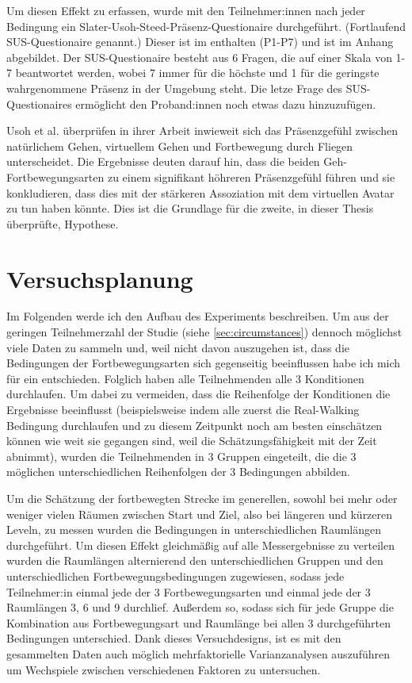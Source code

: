             Um diesen Effekt zu erfassen, wurde mit den Teilnehmer:innen nach jeder Bedingung ein Slater-Usoh-Steed-Präsenz-Questionaire \cite{presence-questionaire} durchgeführt. (Fortlaufend SUS-Questionaire genannt.) Dieser ist im  enthalten (P1-P7) und ist im Anhang abgebildet. Der SUS-Questionaire besteht aus 6 Fragen, die auf einer Skala von 1-7 beantwortet werden, wobei 7 immer für die höchste und 1 für die geringste wahrgenommene Präsenz in der Umgebung steht. Die letze Frage des SUS-Questionaires ermöglicht den Proband:innen noch etwas dazu hinzuzufügen.

            Usoh et al. überprüfen in ihrer Arbeit \cite{usoh-vergleich-1999} inwieweit sich das Präsenzgefühl zwischen natürlichem Gehen, virtuellem Gehen und Fortbewegung durch Fliegen unterscheidet. Die Ergebnisse deuten darauf hin, dass die beiden Geh-Fortbewegungsarten zu einem signifikant höhreren Präsenzgefühl führen und sie konkludieren, dass dies mit der stärkeren Assoziation mit dem virtuellen Avatar zu tun haben könnte. Dies ist die Grundlage für die zweite, in dieser Thesis überprüfte, Hypothese.



    \section{Versuchsplanung}\label{sec:setup}
    Im Folgenden werde ich den Aufbau des Experiments beschreiben.
    Um aus der geringen Teilnehmerzahl der Studie (siehe \autoref{sec:circumstances})
    dennoch möglichst viele Daten zu sammeln und, weil nicht davon auszugehen ist, dass die Bedingungen der Fortbewegungsarten sich gegenseitig beeinflussen habe ich mich für ein  entschieden. Folglich haben alle Teilnehmenden alle 3 Konditionen durchlaufen. Um dabei zu vermeiden, dass die Reihenfolge der Konditionen die Ergebnisse beeinflusst (beispielsweise indem alle zuerst die Real-Walking Bedingung durchlaufen und zu diesem Zeitpunkt noch am besten einschätzen können wie weit sie gegangen sind, weil die Schätzungsfähigkeit mit der Zeit abnimmt), wurden die Teilnehmenden in 3 Gruppen eingeteilt, die die 3 möglichen unterschiedlichen Reihenfolgen der 3 Bedingungen abbilden.

    Um die Schätzung der fortbewegten Strecke im generellen, sowohl bei mehr oder weniger vielen Räumen zwischen Start und Ziel, also bei längeren und kürzeren Leveln, zu messen wurden die Bedingungen in unterschiedlichen Raumlängen durchgeführt. Um diesen Effekt gleichmäßig auf alle Messergebnisse zu verteilen wurden die Raumlängen alternierend den unterschiedlichen Gruppen und den unterschiedlichen Fortbewegungsbedingungen zugewiesen, sodass jede Teilnehmer:in einmal jede der 3 Fortbewegungsarten und einmal jede der 3 Raumlängen 3, 6 und 9 durchlief. Außerdem so, sodass sich für jede Gruppe die Kombination aus Fortbewegungsart und Raumlänge bei allen 3 durchgeführten Bedingungen unterschied. Dank dieses Versuchdesigns, ist es mit den gesammelten Daten auch möglich mehrfaktorielle Varianzanalysen auszuführen um Wechspiele zwischen verschiedenen Faktoren zu untersuchen.


